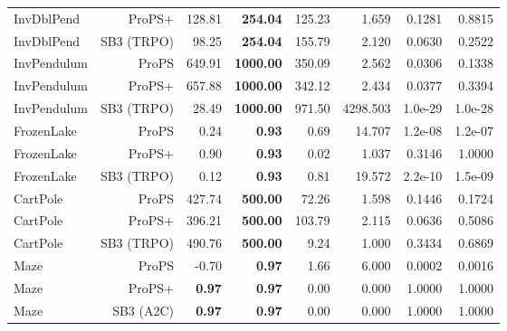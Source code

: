 \begin{tabular}{@{}lrrrrrrr@{}}
InvDblPend & ProPS+ & 128.81 & \cellcolor{bestcolor}\textbf{254.04} & 125.23 & 1.659 & 0.1281 & 0.8815 \\
InvDblPend & SB3 (TRPO) & 98.25 & \cellcolor{bestcolor}\textbf{254.04} & 155.79 & 2.120 & 0.0630 & 0.2522 \\
InvPendulum & ProPS & 649.91 & \cellcolor{bestcolor}\textbf{1000.00} & 350.09 & 2.562 & 0.0306 & 0.1338 \\
InvPendulum & ProPS+ & 657.88 & \cellcolor{bestcolor}\textbf{1000.00} & 342.12 & 2.434 & 0.0377 & 0.3394 \\
InvPendulum & SB3 (TRPO) & 28.49 & \cellcolor{bestcolor}\textbf{1000.00} & 971.50 & 4298.503 & 1.0e-29 & 1.0e-28 \\
FrozenLake & ProPS & 0.24 & \cellcolor{bestcolor}\textbf{0.93} & 0.69 & 14.707 & 1.2e-08 & 1.2e-07 \\
FrozenLake & ProPS+ & 0.90 & \cellcolor{bestcolor}\textbf{0.93} & 0.02 & 1.037 & 0.3146 & 1.0000 \\
FrozenLake & SB3 (TRPO) & 0.12 & \cellcolor{bestcolor}\textbf{0.93} & 0.81 & 19.572 & 2.2e-10 & 1.5e-09 \\
CartPole & ProPS & 427.74 & \cellcolor{bestcolor}\textbf{500.00} & 72.26 & 1.598 & 0.1446 & 0.1724 \\
CartPole & ProPS+ & 396.21 & \cellcolor{bestcolor}\textbf{500.00} & 103.79 & 2.115 & 0.0636 & 0.5086 \\
CartPole & SB3 (TRPO) & 490.76 & \cellcolor{bestcolor}\textbf{500.00} & 9.24 & 1.000 & 0.3434 & 0.6869 \\
Maze & ProPS & -0.70 & \cellcolor{bestcolor}\textbf{0.97} & 1.66 & 6.000 & 0.0002 & 0.0016 \\
Maze & ProPS+ & \cellcolor{bestcolor}\textbf{0.97} & \cellcolor{bestcolor}\textbf{0.97} & 0.00 & 0.000 & 1.0000 & 1.0000 \\
Maze & SB3 (A2C) & \cellcolor{bestcolor}\textbf{0.97} & \cellcolor{bestcolor}\textbf{0.97} & 0.00 & 0.000 & 1.0000 & 1.0000 \\
\bottomrule
\end{tabular}
